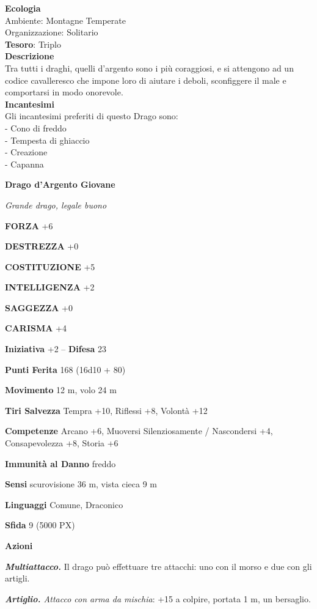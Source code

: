 \begin{multicols}{2}
	\textbf{Ecologia}\\
	Ambiente: Montagne Temperate\\
	Organizzazione: Solitario\\
	\textbf{Tesoro}: Triplo\\
	\textbf{Descrizione}\\
	Tra tutti i draghi, quelli d'argento sono i più coraggiosi, e si attengono ad un codice cavalleresco che impone loro di aiutare i deboli, sconfiggere il male e comportarsi in modo onorevole.\\
	\textbf{Incantesimi}\\
	Gli incantesimi preferiti di questo Drago sono:\\
	- Cono di freddo\\
	- Tempesta di ghiaccio\\
	- Creazione\\
	- Capanna

	\medskip{}\textbf{Drago d'Argento Giovane}

	\textit{Grande drago, legale buono}

	\textbf{FORZA} +6

	\textbf{DESTREZZA} +0

	\textbf{COSTITUZIONE} +5

	\textbf{INTELLIGENZA} +2

	\textbf{SAGGEZZA} +0

	\textbf{CARISMA} +4

	\textbf{Iniziativa} +2 -- \textbf{Difesa} 23

	\textbf{Punti Ferita} 168 (16d10 + 80)

	\textbf{Movimento} 12 m, volo 24 m

	\textbf{Tiri Salvezza} Tempra +10, Riflessi +8, Volontà +12

	\textbf{Competenze} Arcano +6, Muoversi Silenziosamente / Nascondersi +4, Consapevolezza +8, Storia +6

	\textbf{Immunità al Danno} freddo

	\textbf{Sensi} scurovisione 36 m, vista cieca 9 m

	\textbf{Linguaggi} Comune, Draconico

	\textbf{Sfida} 9 (5000 PX)

	\textbf{Azioni}

	\textit{\textbf{Multiattacco.}} Il drago può effettuare tre attacchi: uno con il morso e due con gli artigli.

	\textit{\textbf{Artiglio.} Attacco con arma da mischia}: +15 a colpire, portata 1 m, un bersaglio.


\end{multicols}
